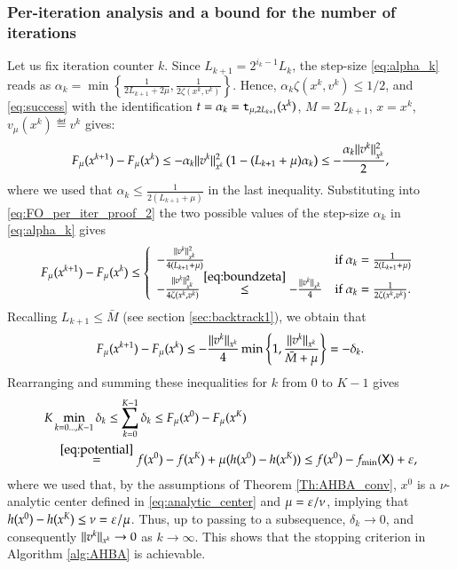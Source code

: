\subsubsection{Per-iteration analysis and a bound for the number of iterations}
Let us fix iteration counter $k$. Since $L_{k+1} = 2^{i_k-1}L_k$, the step-size \eqref{eq:alpha_k} reads as $\alpha_{k}=\min \left\{\frac{1}{2L_{k+1} + 2 \mu},\frac{1}{2\zeta(x^k,v^k)} \right\}$. Hence, $\alpha_{k}\zeta(x^{k},v^{k})\leq 1/2$, and \eqref{eq:success} with the identification $t=\alpha_k = \mathtt{t}_{\mu,2L_{k+1}}(x^{k})$, $M=2L_{k+1}$, $x=x^{k}$, $v_{\mu}(x^{k}) \eqdef v^k$ gives:  
\begin{equation}
\label{eq:FO_per_iter_proof_2}
F_{\mu}(x^{k+1})-F_{\mu}(x^{k})\leq -\alpha_k \lVert v^k\rVert_{x^k}^{2}\left(1-(L_{k+1}+\mu)\alpha_k\right) \leq -\frac{\alpha_k \lVert v^k\rVert_{x^k}^{2}}{2},
\end{equation}
where we used that $\alpha_k \leq \frac{1}{2(L_{k+1}+\mu)}$ in the last inequality. 
Substituting into \eqref{eq:FO_per_iter_proof_2} the two possible values of the step-size $\alpha_k$ in \eqref{eq:alpha_k} gives
\begin{equation}
\label{eq:per_iter_decr_0}
F_{\mu}(x^{k+1})-F_{\mu}(x^{k})\leq 
\left\{
\begin{array}{ll}
- \frac{\norm{v^{k}}_{x^{k}}^{2} }{4(L_{k+1}+\mu)} & \text{if }  \alpha_k=\frac{1}{2(L_{k+1}+\mu)}\\

- \frac{\norm{v^{k}}_{x^{k}}^{2} }{4\zeta(x^k,v^k)}  \stackrel{\eqref{eq:boundzeta}}{\leq} - \frac{\norm{v^{k}}_{x^{k}}}{4} & \text{if }  \alpha_k=\frac{1}{2\zeta(x^k,v^k)}.
\end{array}\right.
\end{equation}
Recalling $L_{k+1} \leq \bar{M}$ (see section \ref{sec:backtrack1}), we obtain that 
\begin{equation}
\label{eq:per_iter_decr}
F_{\mu}(x^{k+1}) - F_{\mu}(x^{k}) \leq  -\frac{\lVert v^{k}\rVert_{x^{k}}}{4} \min\left\{1,  \frac{\lVert v^{k}\rVert_{x^{k}}}{\bar{M}+\mu}\right\}=-\delta_{k}.
\end{equation}
Rearranging and summing these inequalities for $k$ from $0$ to $K-1$ gives
\begin{align}
&K\min_{k=0\ldots,K-1} \delta_{k} \leq  \sum_{k=0}^{K-1}\delta_{k}\leq F_{\mu}(x^{0})-F_{\mu}(x^{K}) \notag \\
& \quad\stackrel{\eqref{eq:potential}}{=} f(x^{0}) - f(x^{K}) + \mu (h(x^{0}) - h(x^{K})) \leq f(x^{0}) - f_{\min}(\mathsf{X}) + \varepsilon, \label{eq:FO_per_iter_proof_6} 
\end{align}
where we used that, by the assumptions of Theorem \ref{Th:AHBA_conv}, $x^{0}$ is a $\nu$-analytic center defined in \eqref{eq:analytic_center} and $\mu = \varepsilon/\nu$, implying that $h(x^{0}) - h(x^{K}) \leq \nu = \varepsilon/\mu$.
Thus, up to passing to a subsequence, $\delta_{k}\to 0$, and consequently $\lVert v^{k}\rVert_{x^{k}} \to 0$ as $k \to \infty$. This shows that the stopping criterion in Algorithm \ref{alg:AHBA} is achievable.

